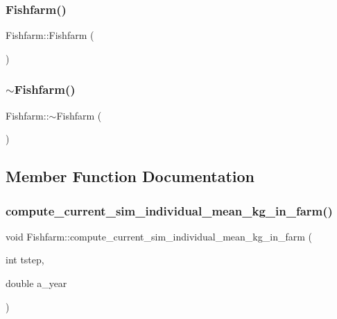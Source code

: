 \mbox{\label{class_fishfarm_a1c61719babbe711e95e179137797fc22}} 
\subsubsection{\texorpdfstring{Fishfarm()}{Fishfarm()}\hspace{0.1cm}{\footnotesize\ttfamily [3/3]}}
{\footnotesize\ttfamily Fishfarm\+::\+Fishfarm (\begin{DoxyParamCaption}{ }\end{DoxyParamCaption})}

\mbox{\label{class_fishfarm_ac6c9f75dd2c65158dcf6c2ad65758f28}} 
\subsubsection{\texorpdfstring{$\sim$Fishfarm()}{~Fishfarm()}}
{\footnotesize\ttfamily Fishfarm\+::$\sim$\+Fishfarm (\begin{DoxyParamCaption}{ }\end{DoxyParamCaption})\hspace{0.3cm}{\ttfamily [virtual]}}



\subsection{Member Function Documentation}
\mbox{\label{class_fishfarm_a84dae66641cd6530bfbc08ba75d3b7e9}} 
\subsubsection{\texorpdfstring{compute\_current\_sim\_individual\_mean\_kg\_in\_farm()}{compute\_current\_sim\_individual\_mean\_kg\_in\_farm()}}
{\footnotesize\ttfamily void Fishfarm\+::compute\+\_\+current\+\_\+sim\+\_\+individual\+\_\+mean\+\_\+kg\+\_\+in\+\_\+farm (\begin{DoxyParamCaption}\item[{int}]{tstep,  }\item[{double}]{a\+\_\+year }\end{DoxyParamCaption})}

